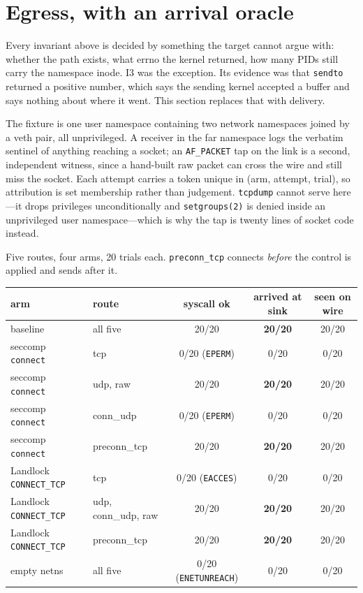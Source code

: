 \documentclass[11pt]{article}
\begin{document}
\section{Egress, with an arrival oracle}\label{sec:egress}

Every invariant above is decided by something the target cannot argue with: whether the path exists,
what errno the kernel returned, how many PIDs still carry the namespace inode. I3 was the exception. Its
evidence was that \texttt{sendto} returned a positive number, which says the sending kernel accepted a
buffer and says nothing about where it went. This section replaces that with delivery.

The fixture is one user namespace containing two network namespaces joined by a veth pair, all
unprivileged. A receiver in the far namespace logs the verbatim sentinel of anything reaching a socket;
an \texttt{AF\_PACKET} tap on the link is a second, independent witness, since a hand-built raw packet
can cross the wire and still miss the socket. Each attempt carries a token unique in (arm, attempt,
trial), so attribution is set membership rather than judgement. \texttt{tcpdump} cannot serve here---it
drops privileges unconditionally and \texttt{setgroups(2)} is denied inside an unprivileged user
namespace---which is why the tap is twenty lines of socket code instead.

Five routes, four arms, 20 trials each. \texttt{preconn\_tcp} connects \emph{before} the control is
applied and sends after it.

\begin{center}
\begin{tabular}{llccc}
\toprule
arm & route & syscall ok & arrived at sink & seen on wire \\
\midrule
baseline & all five            & 20/20 & \textbf{20/20} & 20/20 \\
seccomp \texttt{connect} & tcp  & 0/20 (\texttt{EPERM})  & 0/20 & 0/20 \\
seccomp \texttt{connect} & udp, raw & 20/20 & \textbf{20/20} & 20/20 \\
seccomp \texttt{connect} & conn\_udp & 0/20 (\texttt{EPERM}) & 0/20 & 0/20 \\
seccomp \texttt{connect} & preconn\_tcp & 20/20 & \textbf{20/20} & 20/20 \\
Landlock \texttt{CONNECT\_TCP} & tcp & 0/20 (\texttt{EACCES}) & 0/20 & 0/20 \\
Landlock \texttt{CONNECT\_TCP} & udp, conn\_udp, raw & 20/20 & \textbf{20/20} & 20/20 \\
Landlock \texttt{CONNECT\_TCP} & preconn\_tcp & 20/20 & \textbf{20/20} & 20/20 \\
empty netns & all five         & 0/20 (\texttt{ENETUNREACH}) & 0/20 & 0/20 \\
\bottomrule
\end{tabular}
\end{center}
\end{document}
